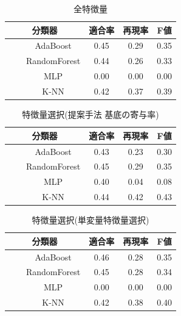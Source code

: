 \documentclass[12pt,a4paper,twocolumn,twoside]{jsik}
\begin{document}
\begin{table}[htb]
  \caption{全特徴量} 
  \label{tab:nmf_class_all}
  \begin{center}
  \begin{tabular}{c|c|c|c} \hline
    分類器 & 適合率 & 再現率 & F値 \\ \hline \hline
　　AdaBoost & 0.45 & 0.29 & 0.35 \\ \hline
　　RandomForest & 0.44 & 0.26 & 0.33 \\ \hline
　　MLP & 0.00 & 0.00 & 0.00 \\ \hline
　　K-NN & 0.42 & 0.37 & 0.39 \\ \hline
  \end{tabular}
  \end{center}
\end{table}
%
\begin{table}[htb]
  \caption{特徴量選択(提案手法 基底の寄与率)} 
  \label{tab:nmf_class_proposed}
  \begin{center}
  \begin{tabular}{c|c|c|c} \hline
    分類器 & 適合率 & 再現率 & F値 \\ \hline \hline
　　AdaBoost & 0.43 & 0.23 & 0.30 \\ \hline
　　RandomForest & 0.45 & 0.29 & 0.35 \\ \hline
　　MLP & 0.40 & 0.04 & 0.08 \\ \hline
　　K-NN & 0.44 & 0.42 & 0.43 \\ \hline
  \end{tabular}
  \end{center}
\end{table}
%
\begin{table}[htb]
  \caption{特徴量選択(単変量特徴量選択)} 
  \label{tab:nmf_class_related1}
  \begin{center}
  \begin{tabular}{c|c|c|c} \hline
    分類器 & 適合率 & 再現率 & F値 \\ \hline \hline
　　AdaBoost & 0.46 & 0.28 & 0.35 \\ \hline
　　RandomForest & 0.45 & 0.28 & 0.34 \\ \hline
　　MLP & 0.00 & 0.00 & 0.00 \\ \hline
　　K-NN & 0.42 & 0.38 & 0.40 \\ \hline
  \end{tabular}
  \end{center}
\end{table}
%
\end{document}
